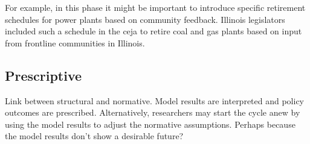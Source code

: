 For example, in this phase it might be important to introduce specific
retirement schedules for power plants based on community feedback. Illinois
legislators included such a schedule in the \acf{ceja} to retire coal and gas
plants based on input from frontline communities in Illinois.

\subsection{Prescriptive}
Link between structural and normative. Model results are interpreted and policy
outcomes are prescribed. Alternatively, researchers may start the cycle anew by
using the model results to adjust the normative assumptions. Perhaps because the
model results don't show a desirable future?
